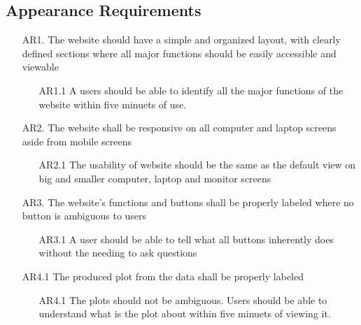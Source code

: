 \documentclass[12pt]{article}
\begin{document}
\subsection{Appearance Requirements}
\begin{itemize}
  \item [AR1.]The website should have a simple and organized layout, with
  clearly defined sections where all major functions should be easily accessible
  and viewable 
  \begin{itemize}
    \item[AR1.1] A users should be able to identify all the major functions of
    the website within five minuets of use.
  \end{itemize}
  \item [AR2.] The website shall be responsive on all computer and laptop
  screens aside from mobile screens
  \begin{itemize}
    \item [AR2.1] The usability of website should be the same as the default
    view on big and smaller computer, laptop and monitor screens
  \end{itemize}
  \item [AR3.] The website's functions and buttons shall be properly labeled
  where no button is ambiguous to users 
  \begin{itemize}
    \item [AR3.1] A user should be able to tell what all buttons inherently does
    without the needing to ask questions
  \end{itemize}
  \item [AR4.1]The produced plot from the data shall be properly labeled
  \begin{itemize}
    \item [AR4.1] The plots should not be ambiguous. Users should be able to
    understand what is the plot about within five minuets of viewing it.
  \end{itemize}
  \subitem
\end{itemize}
\end{document}
